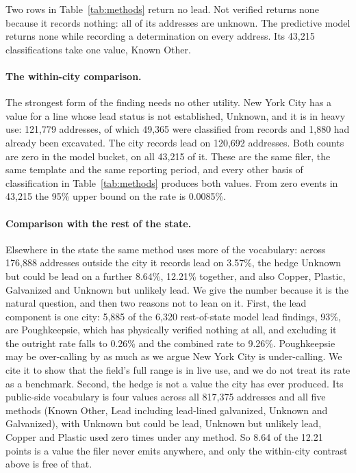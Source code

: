 \documentclass[11pt]{article}
\newcommand{\KO}{\textsf{Known Other}}
\newcommand{\CBL}{\textsf{Unknown but could be lead}}
\begin{document}
Two rows in Table~\ref{tab:methods} return no lead. \textsf{Not verified} returns none because
it records nothing: all of its addresses are unknown. The predictive model returns none while
recording a determination on every address. Its 43,215 classifications take one value, \KO{}.

\paragraph{The within-city comparison.}
The strongest form of the finding needs no other utility. New York City has a value for a line
whose lead status is not established, \textsf{Unknown}, and it is in heavy use: 121,779
addresses, of which 49,365 were classified from records and 1,880 had already been excavated.
The city records lead on 120,692 addresses. Both counts are zero in the model bucket, on all
43,215 of it. These are the same filer, the same template and the same reporting period, and
every other basis of classification in Table~\ref{tab:methods} produces both values. From zero
events in 43,215 the 95\% upper bound on the rate is 0.0085\%.

\paragraph{Comparison with the rest of the state.}
Elsewhere in the state the same method uses more of the vocabulary: across 176,888 addresses
outside the city it records lead on 3.57\%, the hedge \CBL{} on a further 8.64\%, 12.21\%
together, and also \textsf{Copper}, \textsf{Plastic}, \textsf{Galvanized} and
\textsf{Unknown but unlikely lead}. We give the number because it is the natural question, and
then two reasons not to lean on it. First, the lead component is one city: 5,885 of the 6,320
rest-of-state model lead findings, 93\%, are Poughkeepsie, which has physically verified
nothing at all, and excluding it the outright rate falls to 0.26\% and the combined rate to
9.26\%. Poughkeepsie may be over-calling by as much as we argue New York City is under-calling.
We cite it to show that the field's full range is in live use, and we do not treat its rate as
a benchmark. Second, the
hedge is not a value the city has ever produced. Its public-side vocabulary is four values
across all 817,375 addresses and all five methods (\KO{}, \textsf{Lead including
lead-lined galvanized}, \textsf{Unknown} and \textsf{Galvanized}), with \CBL{},
\textsf{Unknown but unlikely lead}, \textsf{Copper} and \textsf{Plastic} used zero times under
any method. So 8.64 of the 12.21 points is a value the filer never emits anywhere, and only
the within-city contrast above is free of that.
\end{document}
